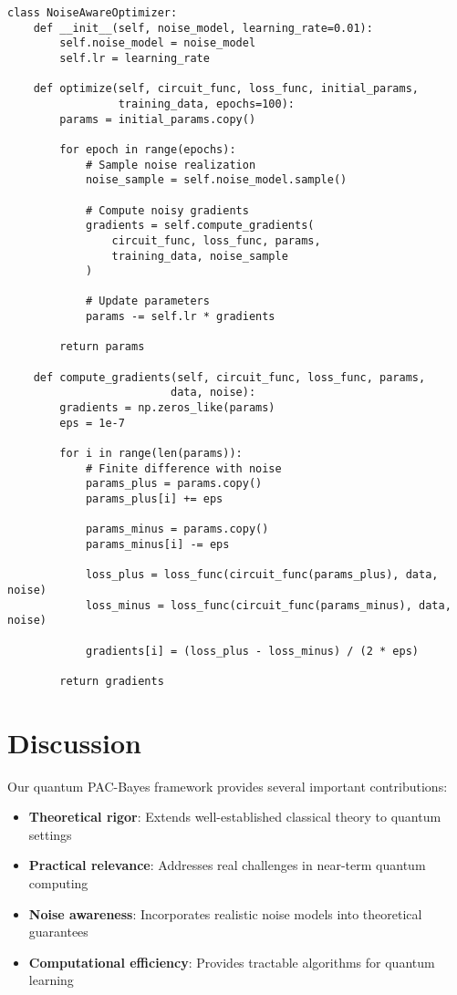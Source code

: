 \documentclass{article}
\begin{document}
\begin{lstlisting}[style=py]
class NoiseAwareOptimizer:
    def __init__(self, noise_model, learning_rate=0.01):
        self.noise_model = noise_model
        self.lr = learning_rate
        
    def optimize(self, circuit_func, loss_func, initial_params, 
                 training_data, epochs=100):
        params = initial_params.copy()
        
        for epoch in range(epochs):
            # Sample noise realization
            noise_sample = self.noise_model.sample()
            
            # Compute noisy gradients
            gradients = self.compute_gradients(
                circuit_func, loss_func, params, 
                training_data, noise_sample
            )
            
            # Update parameters
            params -= self.lr * gradients
            
        return params
        
    def compute_gradients(self, circuit_func, loss_func, params, 
                         data, noise):
        gradients = np.zeros_like(params)
        eps = 1e-7
        
        for i in range(len(params)):
            # Finite difference with noise
            params_plus = params.copy()
            params_plus[i] += eps
            
            params_minus = params.copy() 
            params_minus[i] -= eps
            
            loss_plus = loss_func(circuit_func(params_plus), data, noise)
            loss_minus = loss_func(circuit_func(params_minus), data, noise)
            
            gradients[i] = (loss_plus - loss_minus) / (2 * eps)
            
        return gradients
\end{lstlisting}

\section{Discussion}

Our quantum PAC-Bayes framework provides several important contributions:

\begin{itemize}
\item \textbf{Theoretical rigor}: Extends well-established classical theory to quantum settings
\item \textbf{Practical relevance}: Addresses real challenges in near-term quantum computing
\item \textbf{Noise awareness}: Incorporates realistic noise models into theoretical guarantees
\item \textbf{Computational efficiency}: Provides tractable algorithms for quantum learning
\end{itemize}
\end{document}
